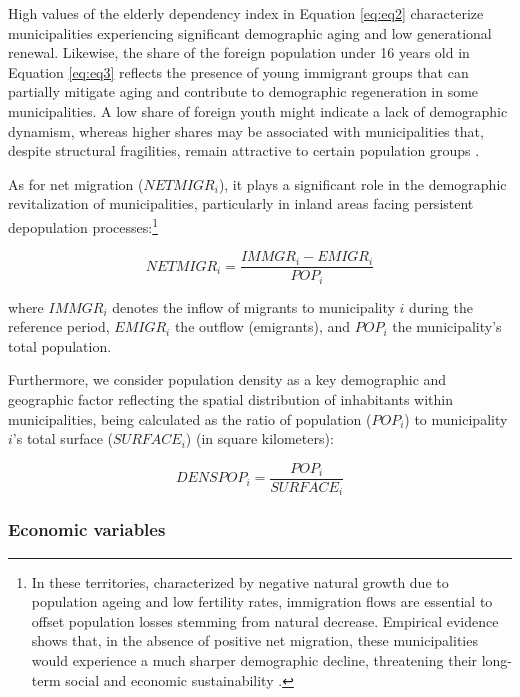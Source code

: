 \documentclass[a4paper,11pt,oneside]{article}
\begin{document}
High values of the elderly dependency index in Equation \eqref{eq:eq2} characterize municipalities experiencing significant demographic aging and low generational renewal. Likewise, the share of the foreign population under 16 years old in Equation \eqref{eq:eq3} reflects the presence of young immigrant groups that can partially mitigate aging and contribute to demographic regeneration in some municipalities. A low share of foreign youth might indicate a lack of demographic dynamism, whereas higher shares may be associated with municipalities that, despite structural fragilities, remain attractive to certain population groups \citep{kuhn2015peripheralization,leibert2016peripheralisation}.




As for net migration ($NETMIGR_i$), it plays a significant role in the demographic revitalization of municipalities, particularly in inland areas facing persistent depopulation processes:\footnote{In these territories, characterized by negative natural growth due to population ageing and low fertility rates, immigration flows are essential to offset population losses stemming from natural decrease. Empirical evidence shows that, in the absence of positive net migration, these municipalities would experience a much sharper demographic decline, threatening their long-term social and economic sustainability \citep[see][]{AlamaSabaterBernatBudi2024}.}



\begin{equation}
\label{eq:eq4}
NETMIGR_i = \frac{IMMGR_i - EMIGR_i}{POP_i}
\end{equation}

\noindent where $IMMGR_i$ denotes the inflow of migrants to municipality $i$ during the reference period, $EMIGR_i$ the outflow (emigrants), and $POP_i$ the municipality's total population.


Furthermore, we consider population density as a key demographic and geographic factor reflecting the spatial distribution of inhabitants within municipalities, being calculated as the ratio of population ($POP_i$) to municipality $i$'s total surface ($SURFACE_i$) (in square kilometers):



\begin{equation}
    \label{eq:eq11}
    DENSPOP_i = \frac{POP_i}{SURFACE_i}
\end{equation}



\subsubsection{Economic variables}
\label{sec:economic_variables}
\end{document}
